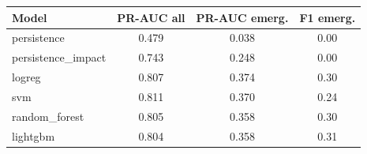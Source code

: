 \begin{tabular}{lccc}
\toprule
Model & PR-AUC all & PR-AUC emerg. & F1 emerg. \\
\midrule
persistence & 0.479 & 0.038 & 0.00 \\
persistence\_impact & 0.743 & 0.248 & 0.00 \\
logreg & 0.807 & 0.374 & 0.30 \\
svm & 0.811 & 0.370 & 0.24 \\
random\_forest & 0.805 & 0.358 & 0.30 \\
lightgbm & 0.804 & 0.358 & 0.31 \\
\bottomrule
\end{tabular}

